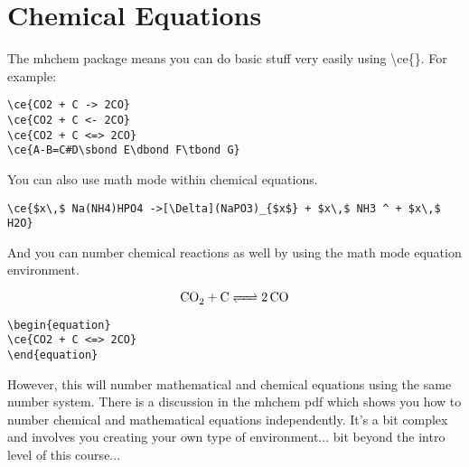 \chapter{Chemical Equations}
The mhchem package means you can do basic stuff very easily using {\textbackslash}ce\{\}. For example:

\vspace{2ex}
\begin{verbatim}
\ce{CO2 + C -> 2CO}
\ce{CO2 + C <- 2CO}
\ce{CO2 + C <=> 2CO}
\ce{A-B=C#D\sbond E\dbond F\tbond G}
\end{verbatim}
\vspace{2ex}
\begin{center}



\end{center}

\vspace{2ex}
You can also use math mode within chemical equations.
\vspace{2ex}

\begin{center}
\end{center}

\begin{verbatim}
\ce{$x\,$ Na(NH4)HPO4 ->[\Delta](NaPO3)_{$x$} + $x\,$ NH3 ^ + $x\,$ H2O}
\end{verbatim}

And you can number chemical reactions as well by using the math mode equation environment.

\begin{equation}
\ce{CO2 + C <=> 2CO}
\end{equation}

\begin{verbatim}
\begin{equation}
\ce{CO2 + C <=> 2CO}
\end{equation}
\end{verbatim}

However, this will number mathematical and chemical equations using the same number system. There is a discussion in the mhchem pdf which shows you how to number chemical and mathematical equations independently. It's a bit complex and involves you creating your own type of environment... bit beyond the intro level of this course...